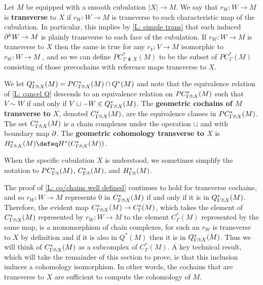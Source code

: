 \begin{definition}
Let $M$ be equipped with a smooth cubulation $|X| \to M$. We say that $r_W \colon W \to M$ is \textbf{transverse} to $X$ if $r_W: W \to M$ is transverse to each characteristic map of the cubulation. In particular, this implies by \cref{L: simple trans} that each induced $\partial^kW \to M$ is plainly transverse to each face of the cubulation. If $r_W \colon W \to M$ is transverse to $X$ then the same is true for any $r_V \colon V \to M$ isomorphic to $r_W \colon W \to M$ , and so we can define $PC^*_{\Gamma \pitchfork X}(M)$ to be the subset of $PC^*_{\Gamma}(M)$ consisting of those precochains with reference maps transverse to $X$.

We let $Q^*_{\Gamma \pitchfork X}(M) = PC_{\Gamma\pitchfork X}^*(M) \cap Q^*(M)$ and note that the equivalence relation of \cref{L: cancel Q} descends to an equivalence relation on $PC_{\Gamma\pitchfork X}^*(M)$ such that $V\sim W$ if and only if $V \sqcup -W \in Q^*_{\Gamma \pitchfork X}(M)$. The \textbf{geometric cochains of $M$ transverse to $X$}, denoted $C_{\Gamma\pitchfork X}^*(M)$, are the equivalence classes in $PC_{\Gamma\pitchfork X}^*(M)$. The set $C_{\Gamma\pitchfork X}^*(M)$ is a chain complexes under the operation $\sqcup$ and with boundary map $\partial$. The \textbf{geometric cohomology transverse to $X$} is $H_{\Gamma\pf X}^*(M) \defeq H^*(C_{\Gamma\pf X}^*(M))$.

When the specific cubulation $X$ is understood, we sometimes simplify the notation to $PC_{\Gamma\pitchfork}^*(M)$, $C_{\Gamma\pitchfork}^*(M)$, and $H_{\Gamma\pitchfork}^*(M)$.
\end{definition}


The proof of \cref{L: co/chains well defined} continues to hold for transverse cochains, and so $r_W \colon W \to M$ represents $0$ in $C^*_{\Gamma\pitchfork X}(M)$ if and only if it is in $Q^*_{\Gamma \pitchfork X}(M)$. Therefore, the evident map $C^*_{\Gamma\pitchfork X}(M) \to C^*_\Gamma(M)$, which takes the element of $C^*_{\Gamma\pitchfork X}(M)$ represented by $r_W \colon W \to M$ to the element $C^*_\Gamma(M)$ represented by the same map, is a monomorphism of chain complexes, for such an $r_W$ is transverse to $X$ by definition and if it is also in $Q^*(M)$ then it is in $Q^*_{\Gamma \pitchfork X}(M)$. Thus we will think of $C^*_{\Gamma\pitchfork X}(M)$ as a subcomplex of $C^*_\Gamma(M)$.
A key technical result, which will take the remainder of this section to prove,
is that this inclusion induces a cohomology isomorphism. In other words, the cochains that are transverse to $X$ are sufficient to compute the cohomology of $M$.

